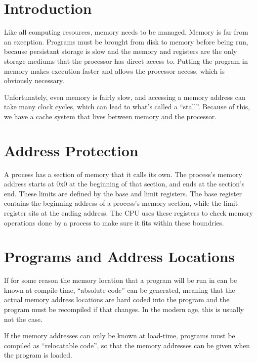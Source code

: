 \documentclass{article}
\begin{document}
\maketitle
\tableofcontents

\section{Introduction}
Like all computing resources, memory needs to be managed. Memory is far from an
exception. Programs must be brought from disk to memory before being run,
because persistant storage is slow and the memory and registers are the only
storage mediums that the processor has direct access to. Putting the program in
memory makes execution faster and allows the processor access, which is
obviously necessary.

Unfortunately, even memory is fairly slow, and accessing a memory address can
take many clock cycles, which can lead to what's called a ``stall''. Because of
this, we have a cache system that lives between memory and the processor.

\section{Address Protection}
A process has a section of memory that it calls its own. The process's memory
address starts at 0x0 at the beginning of that section, and ends at the
section's end. These limits are defined by the base and limit registers. The
base register contains the beginning address of a process's memory section,
while the limit register sits at the ending address. The CPU uses these
registers to check memory operations done by a process to make sure it fits
within these boundries.

\section{Programs and Address Locations}
If for some reason the memory location that a program will be run in can be
known at compile-time, ``absolute code'' can be generated, meaning that the
actual memory address locations are hard coded into the program and the program
must be recompiled if that changes. In the modern age, this is usually not the
case.

If the memory addresses can only be known at load-time, programs must be
compiled as ``relocatable code'', so that the memory addresses can be given
when the program is loaded.
\end{document}
